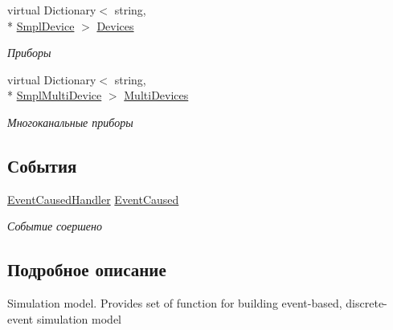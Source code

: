\begin{DoxyCompactItemize}
virtual Dictionary$<$ string, \\*
\hyperlink{class_s_m_p_l_sharp_1_1_objects_1_1_smpl_device}{Smpl\-Device} $>$ \hyperlink{class_s_m_p_l_sharp_1_1_smpl_model_af79bc37f93c34d07abbdf36028581640}{Devices}
\begin{DoxyCompactList}\small\item\em Приборы \end{DoxyCompactList}\item 
virtual Dictionary$<$ string, \\*
\hyperlink{class_s_m_p_l_sharp_1_1_objects_1_1_smpl_multi_device}{Smpl\-Multi\-Device} $>$ \hyperlink{class_s_m_p_l_sharp_1_1_smpl_model_a6a37ccf8af439fc11b156eff04514e2e}{Multi\-Devices}
\begin{DoxyCompactList}\small\item\em Многоканальные приборы \end{DoxyCompactList}\end{DoxyCompactItemize}
\subsection*{События}
\begin{DoxyCompactItemize}
\item 
\hyperlink{namespace_s_m_p_l_sharp_a33fb2904b12541599362cddd40c71357}{Event\-Caused\-Handler} \hyperlink{class_s_m_p_l_sharp_1_1_smpl_model_abfa9344a73f4845e02be97fd5b963ed3}{Event\-Caused}
\begin{DoxyCompactList}\small\item\em Событие соершено \end{DoxyCompactList}\end{DoxyCompactItemize}


\subsection{Подробное описание}
Simulation model. Provides set of function for building event-\/based, discrete-\/event simulation model 



